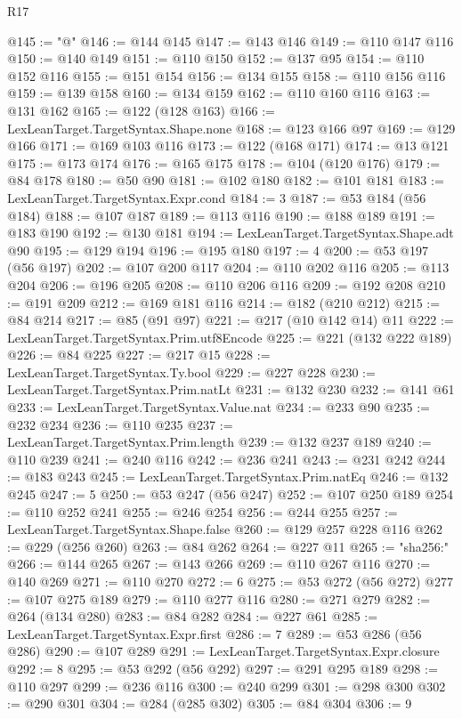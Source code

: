 \begin{lexlean}{R17}
\begin{coremodule}
@145 := "@"
@146 := @144 @145
@147 := @143 @146
@149 := @110 @147 @116
@150 := @140 @149
@151 := @110 @150
@152 := @137 @95
@154 := @110 @152 @116
@155 := @151 @154
@156 := @134 @155
@158 := @110 @156 @116
@159 := @139 @158
@160 := @134 @159
@162 := @110 @160 @116
@163 := @131 @162
@165 := @122 (@128 @163)
@166 := LexLeanTarget.TargetSyntax.Shape.none
@168 := @123 @166 @97
@169 := @129 @166
@171 := @169 @103 @116
@173 := @122 (@168 @171)
@174 := @13 @121
@175 := @173 @174
@176 := @165 @175
@178 := @104 (@120 @176)
@179 := @84 @178
@180 := @50 @90
@181 := @102 @180
@182 := @101 @181
@183 := LexLeanTarget.TargetSyntax.Expr.cond
@184 := 3
@187 := @53 @184 (@56 @184)
@188 := @107 @187
@189 := @113 @116
@190 := @188 @189
@191 := @183 @190
@192 := @130 @181
@194 := LexLeanTarget.TargetSyntax.Shape.adt @90
@195 := @129 @194
@196 := @195 @180
@197 := 4
@200 := @53 @197 (@56 @197)
@202 := @107 @200 @117
@204 := @110 @202 @116
@205 := @113 @204
@206 := @196 @205
@208 := @110 @206 @116
@209 := @192 @208
@210 := @191 @209
@212 := @169 @181 @116
@214 := @182 (@210 @212)
@215 := @84 @214
@217 := @85 (@91 @97)
@221 := @217 (@10 @142 @14) @11
@222 := LexLeanTarget.TargetSyntax.Prim.utf8Encode
@225 := @221 (@132 @222 @189)
@226 := @84 @225
@227 := @217 @15
@228 := LexLeanTarget.TargetSyntax.Ty.bool
@229 := @227 @228
@230 := LexLeanTarget.TargetSyntax.Prim.natLt
@231 := @132 @230
@232 := @141 @61
@233 := LexLeanTarget.TargetSyntax.Value.nat
@234 := @233 @90
@235 := @232 @234
@236 := @110 @235
@237 := LexLeanTarget.TargetSyntax.Prim.length
@239 := @132 @237 @189
@240 := @110 @239
@241 := @240 @116
@242 := @236 @241
@243 := @231 @242
@244 := @183 @243
@245 := LexLeanTarget.TargetSyntax.Prim.natEq
@246 := @132 @245
@247 := 5
@250 := @53 @247 (@56 @247)
@252 := @107 @250 @189
@254 := @110 @252 @241
@255 := @246 @254
@256 := @244 @255
@257 := LexLeanTarget.TargetSyntax.Shape.false
@260 := @129 @257 @228 @116
@262 := @229 (@256 @260)
@263 := @84 @262
@264 := @227 @11
@265 := "sha256:"
@266 := @144 @265
@267 := @143 @266
@269 := @110 @267 @116
@270 := @140 @269
@271 := @110 @270
@272 := 6
@275 := @53 @272 (@56 @272)
@277 := @107 @275 @189
@279 := @110 @277 @116
@280 := @271 @279
@282 := @264 (@134 @280)
@283 := @84 @282
@284 := @227 @61
@285 := LexLeanTarget.TargetSyntax.Expr.first
@286 := 7
@289 := @53 @286 (@56 @286)
@290 := @107 @289
@291 := LexLeanTarget.TargetSyntax.Expr.closure
@292 := 8
@295 := @53 @292 (@56 @292)
@297 := @291 @295 @189
@298 := @110 @297
@299 := @236 @116
@300 := @240 @299
@301 := @298 @300
@302 := @290 @301
@304 := @284 (@285 @302)
@305 := @84 @304
@306 := 9

\end{coremodule}
\end{lexlean}
